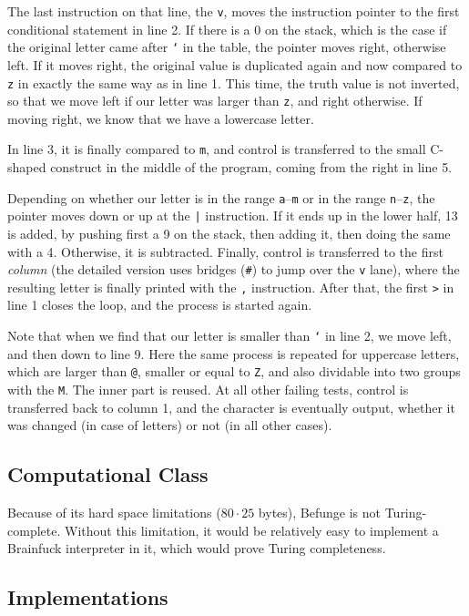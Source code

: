 The last instruction on that line, the \texttt{v}, moves the instruction pointer to the first conditional statement in line 2. If there is a 0 on the stack, which is the case if the original letter came after \texttt{`} in the \ascii{} table, the pointer moves right, otherwise left. If it moves right, the original value is duplicated again and now compared to \texttt{z} in exactly the same way as in line 1. This time, the truth value is not inverted, so that we move left if our letter was larger than \texttt{z}, and right otherwise. If moving right, we know that we have a lowercase letter.

In line 3, it is finally compared to \texttt{m}, and control is transferred to the small C-shaped construct in the middle of the program, coming from the right in line 5.

Depending on whether our letter is in the range \texttt{a}--\texttt{m} or in the range \texttt{n}--\texttt{z}, the pointer moves down or up at the \texttt{|} instruction. If it ends up in the lower half, 13 is added, by pushing first a 9 on the stack, then adding it, then doing the same with a 4. Otherwise, it is subtracted. Finally, control is transferred to the first \emph{column} (the detailed version uses bridges (\texttt{\#}) to jump over the \texttt{v} lane), where the resulting letter is finally printed with the \texttt{,} instruction. After that, the first \texttt{>} in line 1 closes the loop, and the process is started again.

Note that when we find that our letter is smaller than \texttt{`} in line 2, we move left, and then down to line 9. Here the same process is repeated for uppercase letters, which are larger than \texttt{@}, smaller or equal to \texttt{Z}, and also dividable into two groups with the \texttt{M}. The inner part is reused. At all other failing tests, control is transferred back to column 1, and the character is eventually output, whether it was changed (in case of letters) or not (in all other cases).

\subsection{Computational Class}

Because of its hard space limitations ($80\cdot 25$ bytes), Befunge is not Turing-complete. Without this limitation, it would be relatively easy to implement a Brainfuck interpreter in it, which would prove Turing completeness.

\subsection{Implementations}

